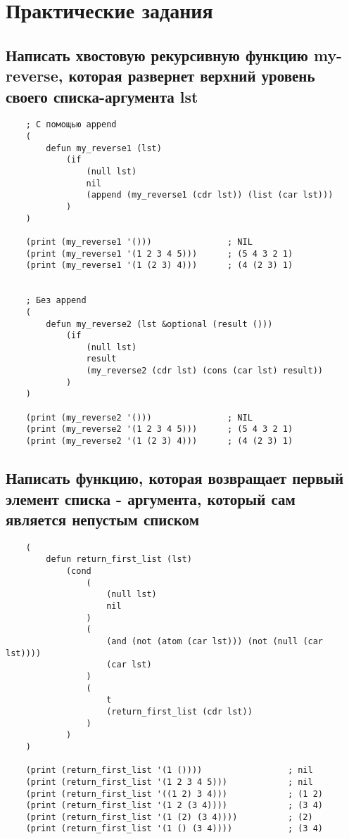 \chapter{Практические задания}

\section{Написать хвостовую рекурсивную функцию my-reverse, которая развернет верхний уровень своего списка-аргумента lst}

\begin{lstlisting}
    ; С помощью append
    (
        defun my_reverse1 (lst)
            (if
                (null lst) 
                nil
                (append (my_reverse1 (cdr lst)) (list (car lst)))
            )
    )
    
    (print (my_reverse1 '()))               ; NIL
    (print (my_reverse1 '(1 2 3 4 5)))      ; (5 4 3 2 1)
    (print (my_reverse1 '(1 (2 3) 4)))      ; (4 (2 3) 1) 
    
    
    ; Без append
    (
        defun my_reverse2 (lst &optional (result ()))
            (if
                (null lst)
                result
                (my_reverse2 (cdr lst) (cons (car lst) result))
            )
    )
    
    (print (my_reverse2 '()))               ; NIL
    (print (my_reverse2 '(1 2 3 4 5)))      ; (5 4 3 2 1)
    (print (my_reverse2 '(1 (2 3) 4)))      ; (4 (2 3) 1) 
\end{lstlisting}

\section{Написать функцию, которая возвращает первый элемент списка - аргумента, который сам является непустым списком}

\begin{lstlisting}
    (
        defun return_first_list (lst)
            (cond
                (
                    (null lst)
                    nil
                )
                (
                    (and (not (atom (car lst))) (not (null (car lst))))  
                    (car lst)
                )
                (
                    t 
                    (return_first_list (cdr lst))
                )
            )
    )
    
    (print (return_first_list '(1 ())))                 ; nil
    (print (return_first_list '(1 2 3 4 5)))            ; nil
    (print (return_first_list '((1 2) 3 4)))            ; (1 2)
    (print (return_first_list '(1 2 (3 4))))            ; (3 4)
    (print (return_first_list '(1 (2) (3 4))))          ; (2)
    (print (return_first_list '(1 () (3 4))))           ; (3 4)
\end{lstlisting}

